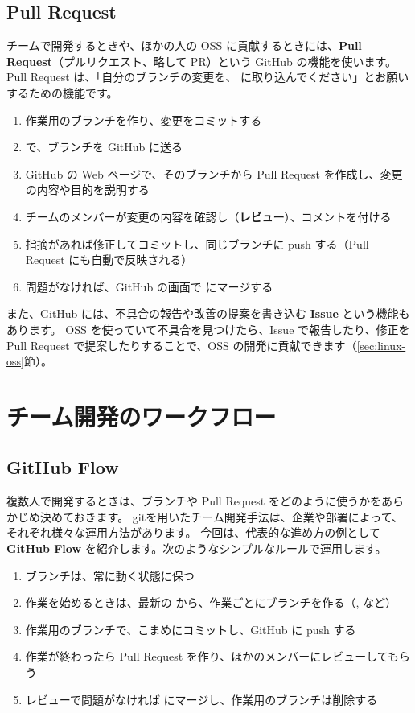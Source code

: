 \subsection{Pull Request}

チームで開発するときや、ほかの人の OSS に貢献するときには、\textbf{Pull Request}（プルリクエスト、略して PR）という GitHub の機能を使います。
Pull Request は、「自分のブランチの変更を、 に取り込んでください」とお願いするための機能です。

\begin{enumerate}
  \item 作業用のブランチを作り、変更をコミットする
  \item {} で、ブランチを GitHub に送る
  \item GitHub の Web ページで、そのブランチから Pull Request を作成し、変更の内容や目的を説明する
  \item チームのメンバーが変更の内容を確認し（\textbf{レビュー}）、コメントを付ける
  \item 指摘があれば修正してコミットし、同じブランチに push する（Pull Request にも自動で反映される）
  \item 問題がなければ、GitHub の画面で  にマージする
\end{enumerate}

また、GitHub には、不具合の報告や改善の提案を書き込む \textbf{Issue} という機能もあります。
OSS を使っていて不具合を見つけたら、Issue で報告したり、修正を Pull Request で提案したりすることで、OSS の開発に貢献できます（\ref{sec:linux-oss}節）。

\section{チーム開発のワークフロー}
\label{sec:git-workflow}

\subsection{GitHub Flow}

複数人で開発するときは、ブランチや Pull Request をどのように使うかをあらかじめ決めておきます。
gitを用いたチーム開発手法は、企業や部署によって、それぞれ様々な運用方法があります。
今回は、代表的な進め方の例として \textbf{GitHub Flow} を紹介します。次のようなシンプルなルールで運用します。

\begin{enumerate}
  \item {} ブランチは、常に動く状態に保つ
  \item 作業を始めるときは、最新の  から、作業ごとにブランチを作る（,  など）
  \item 作業用のブランチで、こまめにコミットし、GitHub に push する
  \item 作業が終わったら Pull Request を作り、ほかのメンバーにレビューしてもらう
  \item レビューで問題がなければ  にマージし、作業用のブランチは削除する
\end{enumerate}

